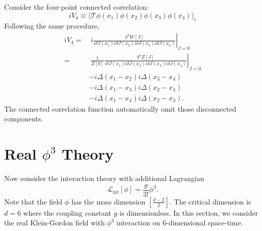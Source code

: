 \begin{framedexpl}
Consider the four-point connected correlation:
\begin{equation*}
	iV_4 \equiv \langle \mathcal{T}\phi(x_1) \phi(x_2) \phi(x_3) \phi(x_4)\rangle_c
\end{equation*}
Following the same procedure,
\begin{equation*}
\begin{aligned}
	iV_4 
	=&\ i\left.\frac{\delta^4 W[J]}{i\delta J(x_1)i\delta J(x_2)i\delta J(x_3)i\delta J(x_4)}\right|_{J=0} \\
	=&\ \frac{1}{Z[0]}\left.\frac{\delta^4 Z[J]}{i\delta J(x_1)i\delta J(x_2)i\delta J(x_3)i\delta J(x_4)}\right|_{J=0} \\
	& -i\Delta(x_1-x_2) i\Delta(x_3-x_4) \\
	& -i\Delta(x_1-x_3) i\Delta(x_2-x_4) \\
	& -i\Delta(x_1-x_4) i\Delta(x_2-x_3).
\end{aligned}
\end{equation*}
The connected correlation function automatically omit those disconnected components.
\end{framedexpl}




\section{Real $\phi^3$ Theory}

Now consider the interaction theory with additional Lagrangian
\begin{equation}
	\mathcal L_{\mathrm{int}}[\phi] = \frac{g}{3!}\phi^3.
\end{equation}
Note that the field $\phi$ has the mass dimension $[\frac{d-2}{2}]$. 
The critical dimension is $d=6$ where the coupling constant $g$ is dimensionless. 
In this section, we consider the real Klein-Gordon field with $\phi^3$ interaction on 6-dimensional space-time.


